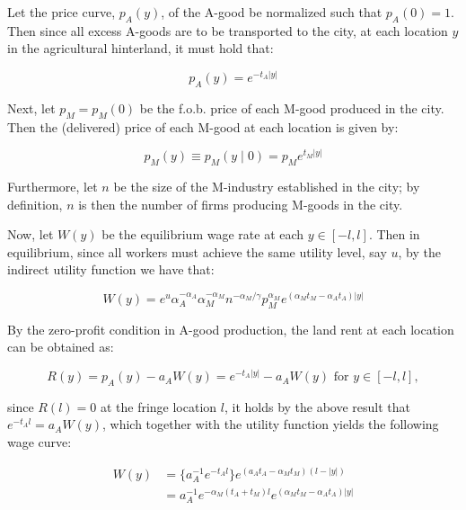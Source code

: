 Let the price curve, $p_A(y)$, of the A-good be normalized such that $p_A(0) = 1$. Then since all excess A-goods are to be transported to the city, at each location $y$ in the agricultural hinterland, it must hold that:

\begin{equation}
  p_A(y) = e^{-t_A |y|}
\end{equation}

Next, let $p_M = p_M(0)$ be the f.o.b. price of each M-good produced in the city. Then the (delivered) price of each M-good at each location is given by:

\begin{equation}
  p_M(y) \equiv p_M(y \mid 0) = p_M e^{t_M |y|}
\end{equation}

Furthermore, let $n$ be the size of the M-industry established in the city; by definition, $n$ is then the number of firms producing M-goods in the city.

Now, let $W(y)$ be the equilibrium wage rate at each $y \in [-l, l]$. Then in equilibrium, since all workers must achieve the same utility level, say $u$, by the indirect utility function we have that:

\begin{equation}
  W(y) = e^{u} \alpha_A^{-\alpha_A} \alpha_M^{-\alpha_M} n^{-\alpha_M / \gamma} p_M^{\alpha_M} e^{(\alpha_M t_M - \alpha_A t_A) |y|}
\end{equation}

By the zero-profit condition in A-good production, the land rent at each location can be obtained as:

\begin{equation}
  R(y) = p_A(y) - a_A W(y) = e^{-t_A|y|} - a_A W(y) \text{ for } y \in [-l, l],
\end{equation}

since $R(l) = 0$ at the fringe location $l$, it holds by the above result that $e^{-t_A l} = a_A W(y)$, which together with the utility function yields the following wage curve:

\begin{equation*}
  \begin{aligned}
  W(y) & = \{a_A^{-1} e^{-t_A l}\} e^{(a_A t_A - \alpha_M t_M)(l - |y|)} \\
       & = a_A^{-1} e^{-\alpha_M (t_A + t_M)l} e^{(\alpha_M t_M - \alpha_A t_A)|y|}
  \end{aligned}
\end{equation*}

